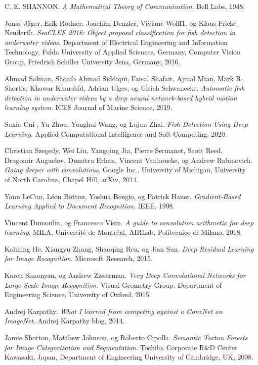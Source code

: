\documentclass[11ot]{article}
\begin{document}
\begin{thebibliography}{9}
C. E. SHANNON. 
\textit{A Mathematical Theory of Communication}. 
Bell Labs, 1948.

Jonas Jäger, Erik Rodner, Joachim Denzler, Viviane Wolff1, og Klaus Fricke-Neuderth. 
\textit{SeaCLEF 2016: Object proposal classification for fish detection in underwater videos}. 
Department of Electrical Engineering and Information Technology, Fulda University of Applied Sciences, Germany, Computer Vision Group, Friedrich Schiller University Jena, Germany, 2016.

Ahmad Salman, Shoaib Ahmad Siddiqui, Faisal Shafait, Ajmal Mian, Mark R. Shortis, Khawar Khurshid, Adrian Ulges, og Ulrich Schwanecke. 
\textit{Automatic fish detection in underwater videos by a deep neural network-based hybrid motion learning system}. 
ICES Journal of Marine Science, 2019.

Suxia Cui , Yu Zhou, Yonghui Wang, og Lujun Zhai. 
\textit{Fish Detection Using Deep Learning}. 
Applied Computational Intelligence and Soft Computing, 2020.

Christian Szegedy, Wei Liu, Yangqing Jia, Pierre Sermanet, Scott Reed, Dragomir Anguelov, Dumitru Erhan, Vincent Vanhoucke, og Andrew Rabinovich. 
\textit{Going deeper with convolutions}. 
Google Inc., University of Michigan, University of North Carolina, Chapel Hill, arXiv, 2014.

Yann LeCun, Léon Bottou, Yoshua Bengio, og Patrick Haner. 
\textit{Gradient-Based Learning Applied to Document Recognition}. 
IEEE, 1998.

Vincent Dumoulin, og Francesco Visin. 
\textit{A guide to convolution arithmetic for deep learning}. 
MILA, Université de Montréal, AIRLab, Politecnico di Milano, 2018.

Kaiming He, Xiangyu Zhang, Shaoqing Ren, og Jian Sun. 
\textit{Deep Residual Learning for Image Recognition}. 
Microsoft Research, 2015.

Karen Simonyan, og Andrew Zisserman. 
\textit{Very Deep Convolutional Networks for Large-Scale Image Recognition}. 
Visual Geometry Group, Department of Engineering Science, University of Oxford, 2015.

Andrej Karpathy. 
\textit{What I learned from competing against a ConvNet on ImageNet}. 
Andrej Karpathy blog, 2014.

Jamie Shotton, Matthew Johnson, og Roberto Cipolla. 
\textit{Semantic Texton Forests for Image Categorization and Segmentation}. 
Toshiba Corporate R\&D Center Kawasaki, Japan, Department of Engineering University of Cambridge, UK, 2008.


\end{thebibliography}
\end{document}
